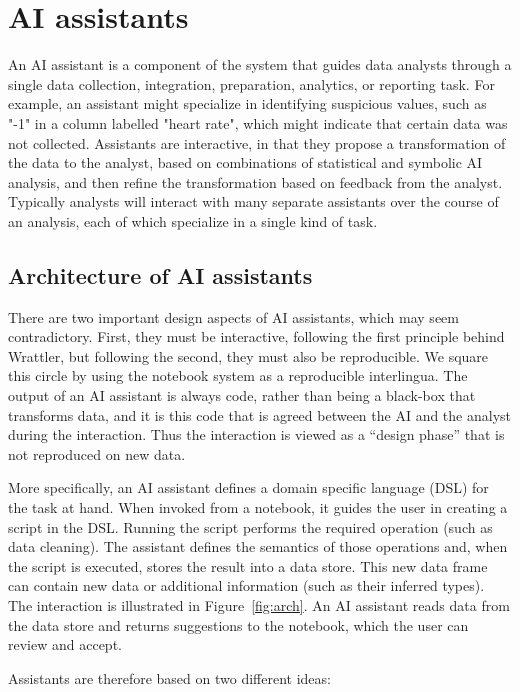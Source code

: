 \documentclass[sigplan,preprint,10pt]{acmart}\settopmatter{printfolios=true,printccs=false,printacmref=false}
\theoremstyle{plain}
\theoremstyle{definition}
\begin{document}
\section{AI assistants}
\label{sec:ai}

{
An AI assistant is a component
of the system that
guides data analysts through a single data collection, integration, preparation,
analytics, or reporting task.
For example, an assistant might
specialize in identifying suspicious
values, such as "-1" in a column labelled
"heart rate", which might indicate
that certain data was not collected.
Assistants are interactive, in that
they propose a transformation
of the data to the analyst, based on combinations
of statistical and symbolic AI analysis,
and then refine the transformation
based on feedback from the analyst.
Typically analysts will interact with many separate assistants over
the course of an analysis, each of which specialize in a single kind of task.

\subsection{Architecture of AI assistants}

There are two important design aspects of AI assistants, which may seem
contradictory.
 First, they must be interactive, following
 the first principle behind Wrattler, but
 following the second,
 they must also be reproducible.
We square this circle by using the notebook
system as a reproducible interlingua.
The output of an AI assistant is always code, rather
than being a black-box that transforms data,
and it is this code that is agreed between the AI and the analyst during the interaction.
Thus the interaction is viewed as a ``design phase''
that is not reproduced on new data.

More specifically, an AI assistant defines a domain specific language (DSL) for the task at hand. When invoked from
a notebook, it guides the user in creating a script in the DSL. Running the script performs
the required operation (such as data cleaning). The assistant defines the semantics
of those operations and, when the script is executed, stores the result into a data
store. This new data frame can contain new data or additional information (such as their
inferred types).
The interaction is illustrated in Figure~\ref{fig:arch}. An AI assistant reads data from the data
store and returns suggestions to the notebook, which the user can review and accept.

Assistants are therefore based on two different ideas:

}
\end{document}
